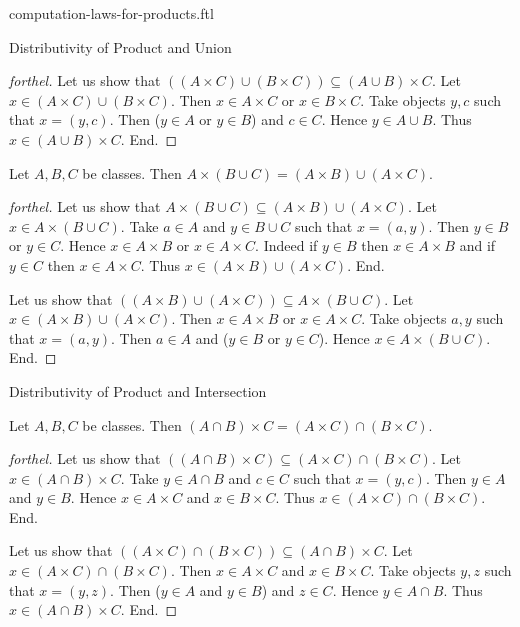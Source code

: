 \documentclass{naproche-library}
\begin{document}
\begin{smodule}[title=Computation Laws for Cartesian Products]{computation-laws-for-products.ftl}
\begin{sfragment}{Distributivity of Product and Union}
\begin{proof}[forthel]
    Let us show that $((A \times C) \cup (B \times C)) \subseteq (A \cup B) \times C$. %
      Let $x \in (A \times C) \cup (B \times C)$.
      Then $x \in A \times C$ or $x \in B \times C$.
      Take objects $y, c$ such that $x = (y, c)$.
      Then ($y \in A$ or $y \in B$) and $c \in C$.
      Hence $y \in A \cup B$.
      Thus $x \in (A \cup B) \times C$.
    End.
  \end{proof}

  \begin{proposition}[forthel,id=FOUNDATIONS_05_476526841692160]
    Let $A, B, C$ be classes.
    Then $A \times (B \cup C) = (A \times B) \cup (A \times C)$.
  \end{proposition}
  \begin{proof}[forthel]
    Let us show that $A \times (B \cup C) \subseteq (A \times B) \cup (A \times C)$.
      Let $x \in A \times (B \cup C)$.
      Take $a \in A$ and $y \in B \cup C$ such that $x = (a, y)$.
      Then $y \in B$ or $y \in C$.
      Hence $x \in A \times B$ or $x \in A \times C$.
      Indeed if $y \in B$ then $x \in A \times B$ and if $y \in C$ then $x \in A \times C$.
      Thus $x \in (A \times B) \cup (A \times C)$.
    End.

    Let us show that $((A \times B) \cup (A \times C)) \subseteq A \times (B \cup C)$.
      Let $x \in (A \times B) \cup (A \times C)$.
      Then $x \in A \times B$ or $x \in A \times C$.
      Take objects $a, y$ such that $x = (a, y)$.
      Then $a \in A$ and ($y \in B$ or $y \in C$).
      Hence $x \in A \times (B \cup C)$.
    End.
  \end{proof}
\end{sfragment}

\begin{sfragment}{Distributivity of Product and Intersection}
  \begin{proposition}[forthel,id=FOUNDATIONS_05_1249567930580992]
    Let $A, B, C$ be classes.
    Then $(A \cap B) \times C = (A \times C) \cap (B \times C)$.
  \end{proposition}
  \begin{proof}[forthel]
    Let us show that $((A \cap B) \times C) \subseteq (A \times C) \cap (B \times C)$. %
      Let $x \in (A \cap B) \times C$.
      Take $y \in A \cap B$ and $c \in C$ such that $x = (y, c)$.
      Then $y \in A$ and $y \in B$.
      Hence $x \in A \times C$ and $x \in B \times C$.
      Thus $x \in (A \times C) \cap (B \times C)$.
    End.

    Let us show that $((A \times C) \cap (B \times C)) \subseteq (A \cap B) \times C$. %
      Let $x \in (A \times C) \cap (B \times C)$.
      Then $x \in A \times C$ and $x \in B \times C$.
      Take objects $y, z$ such that $x = (y, z)$.
      Then ($y \in A$ and $y \in B$) and $z \in C$.
      Hence $y \in A \cap B$.
      Thus $x \in (A \cap B) \times C$.
    End.
  \end{proof}


\end{sfragment}
\end{smodule}
\end{document}
